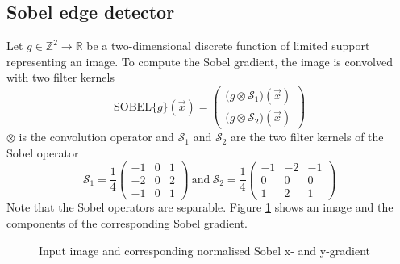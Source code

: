 \documentclass[a4paper,12pt]{book}
\begin{document}
\subsection{Sobel edge detector}\label{cha:sobeledges}
Let $g\in\mathbb{Z}^2\to\mathbb{R}$ be a two-dimensional discrete function
of limited support representing an image.
To compute the Sobel gradient, the image is convolved with
two filter kernels
\begin{equation*}
  \mathrm{SOBEL}\{g\}(\vec{x})=\begin{pmatrix}
    \big(g\otimes\mathcal{S}_1\big)(\vec{x}) \\
    \big(g\otimes\mathcal{S}_2\big)(\vec{x})
  \end{pmatrix}
\end{equation*}
$\otimes$ is the convolution operator and $\mathcal{S}_1$ and $\mathcal{S}_2$
are the two filter kernels of the Sobel operator
\begin{equation*}
  \mathcal{S}_1=\displaystyle\frac{1}{4}
  \begin{pmatrix} -1 &  0 &  1 \\ -2 &  0 &  2 \\ -1 &  0 &  1 \end{pmatrix}
  \mathrm{\ and\ }
  \mathcal{S}_2=\displaystyle\frac{1}{4}
  \begin{pmatrix} -1 & -2 & -1 \\  0 &  0 &  0 \\  1 &  2 &  1 \end{pmatrix}
\end{equation*}
Note that the Sobel operators are separable.
Figure \ref{fig:sobelgradient} shows an image and the components of the
corresponding Sobel gradient.
\begin{figure}[htbp]
   \begin{center}
     \begin{minipage}[c]{.3\textwidth}
     \end{minipage}
     \begin{minipage}[c]{.3\textwidth}
     \end{minipage}
     \begin{minipage}[c]{.3\textwidth}
     \end{minipage}
     \caption{Input image and corresponding normalised Sobel x- and
       y-gradient\label{fig:sobelgradient}}
   \end{center}
\end{figure}
\end{document}
